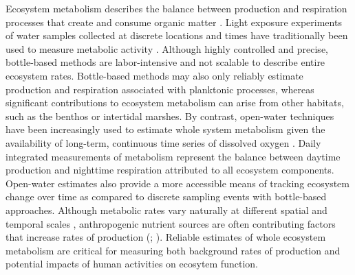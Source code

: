 \documentclass[letterpaper,12pt,oneside]{article}\usepackage[]{graphicx}\usepackage[]{color}
\begin{document}
Ecosystem metabolism describes the balance between production and respiration processes that create and consume organic matter \citep{Kemp12,Needoba12}.  Light exposure experiments of water samples collected at discrete locations and times have traditionally been used to measure metabolic activity \citep{Gaarder27}.  Although highly controlled and precise, bottle-based methods are labor-intensive and not scalable to describe entire ecosystem rates.  Bottle-based methods may also only reliably estimate production and respiration associated with planktonic processes, whereas significant contributions to ecosystem metabolism can arise from other habitats, such as the benthos or intertidal marshes.  By contrast, open-water techniques have been increasingly used to estimate whole system metabolism given the availability of long-term, continuous time series of dissolved oxygen \citep{Odum56,Davanzo96}. Daily integrated measurements of metabolism represent the balance between daytime production and nighttime respiration attributed to all ecosystem components. Open-water estimates also provide a more accessible means of tracking ecosystem change over time as compared to discrete sampling events with bottle-based approaches. Although metabolic rates vary naturally at different spatial and temporal scales \citep{Ziegler98,Caffrey04,Russell07}, anthropogenic nutrient sources are often contributing factors that increase rates of production (\citealt{Nixon95}; ).  Reliable estimates of whole ecosystem metabolism are critical for measuring both background rates of production and potential impacts of human activities on ecosytem function.     
\end{document}
